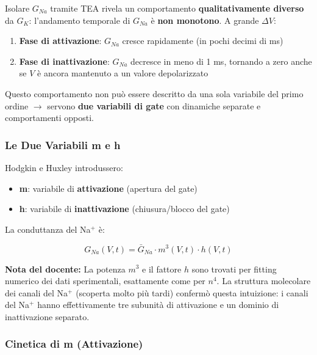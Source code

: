 Isolare $G_{Na}$ tramite TEA rivela un comportamento \textbf{qualitativamente diverso} da $G_K$: l'andamento temporale di $G_{Na}$ è \textbf{non monotono}. A grande $\Delta V$:

\begin{enumerate}
    \item \textbf{Fase di attivazione}: $G_{Na}$ cresce rapidamente (in pochi decimi di ms)
    \item \textbf{Fase di inattivazione}: $G_{Na}$ decresce in meno di 1 ms, tornando a zero anche se $V$ è ancora mantenuto a un valore depolarizzato
\end{enumerate}

Questo comportamento non può essere descritto da una sola variabile del primo ordine $\rightarrow$ servono \textbf{due variabili di gate} con dinamiche separate e comportamenti opposti.

\subsubsection{Le Due Variabili m e h}

Hodgkin e Huxley introdussero:

\begin{itemize}
    \item \textbf{m}: variabile di \textbf{attivazione} (apertura del gate)
    \item \textbf{h}: variabile di \textbf{inattivazione} (chiusura/blocco del gate)
\end{itemize}

La conduttanza del Na$^+$ è:

\begin{equation}
G_{Na}(V, t) = \bar{G}_{Na} \cdot m^3(V, t) \cdot h(V, t)
\end{equation}

\begin{tcolorbox}[colback=gray!5, colframe=gray!40, arc=2mm, boxrule=0.5pt]
\textbf{Nota del docente:} La potenza $m^3$ e il fattore $h$ sono trovati per fitting numerico dei dati sperimentali, esattamente come per $n^4$. La struttura molecolare dei canali del Na$^+$ (scoperta molto più tardi) confermò questa intuizione: i canali del Na$^+$ hanno effettivamente tre subunità di attivazione e un dominio di inattivazione separato.
\end{tcolorbox}




\subsubsection{Cinetica di m (Attivazione)}

